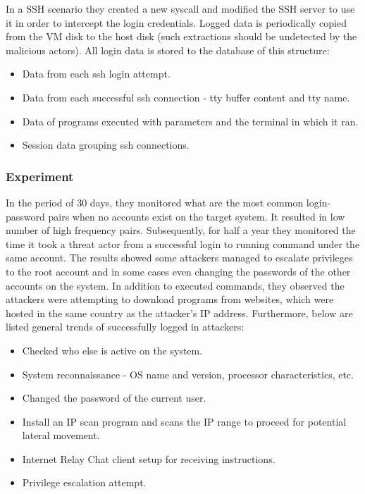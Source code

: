 In a SSH scenario they created a new syscall and modified the SSH server to use it in order to intercept the login credentials. Logged data is periodically copied from the VM disk to the host disk (such extractions should be undetected by the malicious actors). All login data is stored to the database of this structure:

\begin{itemize}[noitemsep]
	\item Data from each ssh login attempt.
	\item Data from each successful ssh connection - tty buffer content and tty name.
	\item Data of programs executed with parameters and the terminal in which it ran.
	\item Session data grouping ssh connections.
\end{itemize}

\subsubsection*{Experiment \label{related:active-anal:hih-study:experiment}}
In the period of 30 days, they monitored what are the most common login-password pairs when no accounts exist on the target system. It resulted in low number of high frequency pairs. Subsequently, for half a year they monitored the time it took a threat actor from a successful login to running command under the same account. The results showed some attackers managed to escalate privileges to the root account and in some cases even changing the passwords of the other accounts on the system. In addition to executed commands, they observed the attackers were attempting to download programs from websites, which were hosted in the same country as the attacker's IP address. Furthermore, below are listed general trends of successfully logged in attackers:
\begin{itemize}[noitemsep]
	\item Checked who else is active on the system.
	\item System reconnaissance - OS name and version, processor characteristics, etc.
	\item Changed the password of the current user.
	\item Install an IP scan program and scans the IP range to proceed for
	potential lateral movement.
	\item Internet Relay Chat client setup for receiving instructions.
	\item Privilege escalation attempt.
\end{itemize}

